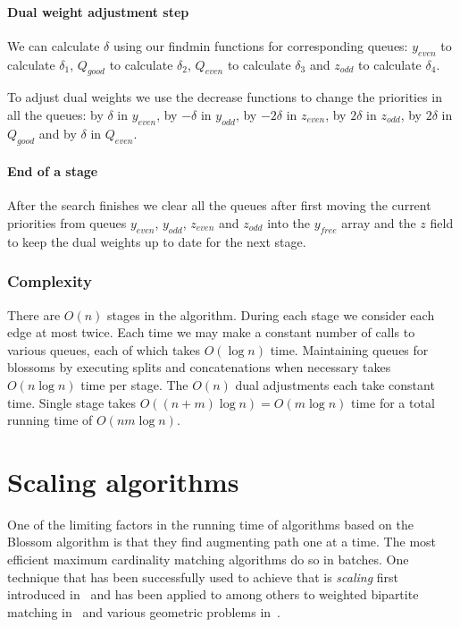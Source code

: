 \paragraph*{Dual weight adjustment step} We can calculate $\delta$ using our findmin functions for corresponding queues: $y_{even}$ to calculate $\delta_1$, $Q_{good}$ to calculate $\delta_2$, $Q_{even}$ to calculate $\delta_3$ and $z_{odd}$ to calculate $\delta_4$. 

To adjust dual weights we use the decrease functions to change the priorities in all the queues: by $\delta$ in $y_{even}$, by $-\delta$ in $y_{odd}$, by $-2\delta$ in $z_{even}$, by $2\delta$ in $z_{odd}$, by $2\delta$ in $Q_{good}$ and by $\delta$ in $Q_{even}$.

\paragraph*{End of a stage} After the search finishes we clear all the queues after first moving the current priorities from queues $y_{even}$, $y_{odd}$, $z_{even}$ and $z_{odd}$ into the $y_{free}$ array and the $z$ field to keep the dual weights up to date for the next stage.

\subsubsection{Complexity}

There are $O(n)$ stages in the algorithm. During each stage we consider each edge at most twice. Each time we may make a constant number of calls to various queues, each of which takes $O(\log n)$ time. Maintaining queues for blossoms by executing splits and concatenations when necessary takes $O(n \log n)$ time per stage. The $O(n)$ dual adjustments each take constant time. Single stage takes $O((n + m) \log n) = O(m \log n)$ time for a total running time of $O(nm \log n)$.

\section{Scaling algorithms}

One of the limiting factors in the running time of algorithms based on the Blossom algorithm is that they find augmenting path one at a time. The most efficient maximum cardinality matching algorithms do so in batches. One technique that has been successfully used to achieve that is \textit{scaling} first introduced in~\cite{edmonds1972theoretical} and has been applied to among others to weighted bipartite matching in~\cite{gabow1989faster} and various geometric problems in~\cite{gabow1984scaling}. 

